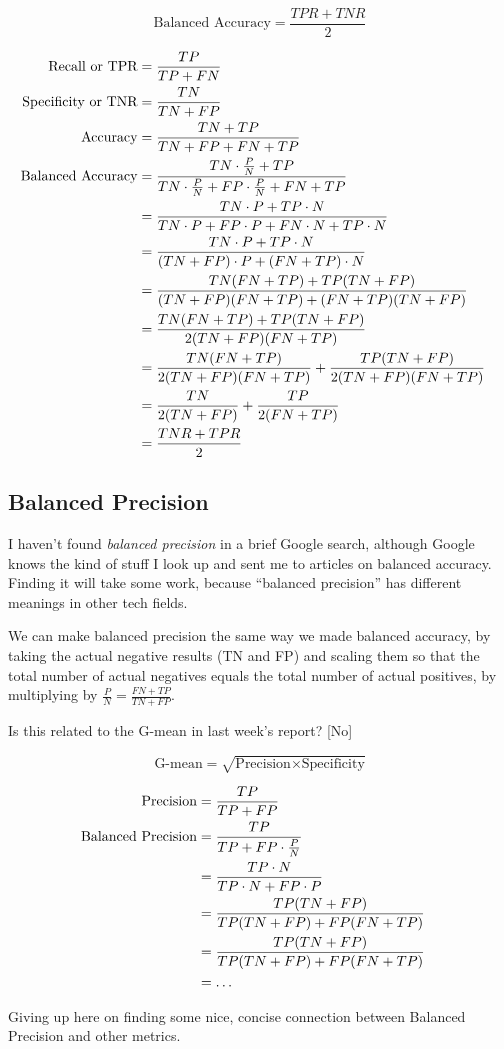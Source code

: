 \documentclass[11pt]{article}
\begin{document}
\begin{spacing}{1.2}
$$\text{Balanced Accuracy} = \frac{TPR + TNR}{2}$$

\begin{align*}
	\text{Recall or TPR} &= \frac{TP}{TP+FN} \cr
	\text{Specificity or TNR} &= \frac{TN}{TN+FP} \cr
	\text{Accuracy} &= \frac{TN+TP}{TN+FP+FN+TP} \cr
	\text{Balanced Accuracy} &=  \frac{TN \cdot \frac{P}{N}+TP}{TN \cdot \frac{P}{N}+FP \cdot \frac{P}{N}+FN+TP} \cr
		&= \frac{TN \cdot P+TP \cdot N}{TN \cdot P+FP \cdot P+FN \cdot N+TP\cdot N} \cr
	&= \frac{TN \cdot P+TP \cdot N}{(TN+FP) \cdot P+(FN+TP) \cdot  N} \cr
	&= \frac{TN (FN+TP)+TP (TN+FP)}{(TN+FP) (FN+TP)+(FN+TP) (TN+FP)} \cr
	&= \frac{TN (FN+TP)+TP (TN+FP)}{2(TN+FP) (FN+TP)} \cr
	&= \frac{TN (FN+TP)}{2(TN+FP) (FN+TP)}  + \frac{TP (TN+FP)}{2(TN+FP) (FN+TP)} \cr
	&= \frac{TN}{2(TN+FP) }  + \frac{TP }{2 (FN+TP)} \cr
	&= \frac{TNR+TPR}{2} \cr
\end{align*}

\subsection{Balanced Precision}

I haven't found {\it balanced precision} in a brief Google search, although Google knows the kind of stuff I look up and sent me to articles on balanced accuracy.  Finding it will take some work, because ``balanced precision'' has different meanings in other tech fields.  

We can make balanced precision the same way we made balanced accuracy, by taking the actual negative results (TN and FP) and scaling them  so that the total number of actual negatives equals the total number of actual positives, by multiplying by $\frac{P}{N} = \frac{FN+TP}{TN+FP}$.

Is this related to the G-mean in last week's report?  [No]

$$\text{G-mean} = \sqrt{\text{Precision} \times \text{Specificity}}$$

\begin{align*}
	\text{Precision} &= \frac{TP}{TP+FP} \cr
	\text{Balanced Precision} &= \frac{TP}{TP+FP \cdot \frac{P}{N}} \cr
		&= \frac{TP \cdot N}{TP \cdot N + FP \cdot P} \cr
		&= \frac{TP (TN+FP)}{TP(TN+FP) + FP (FN+TP)} \cr
		&= \frac{TP (TN+FP)}{TP(TN+FP) + FP (FN+TP)} \cr
		&= \dots \cr
\end{align*}

Giving up here on finding some nice, concise connection between Balanced Precision and other metrics.  


\end{spacing}
\end{document}
